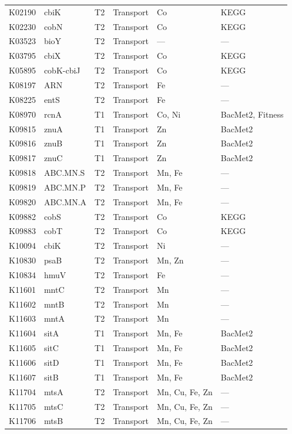 \documentclass[11pt]{article}
\begin{document}
\begin{longtable}{@{}llllp{3.8cm}l@{}}
K02190 & cbiK & T2 & Transport & Co & KEGG \\
K02230 & cobN & T2 & Transport & Co & KEGG \\
K03523 & bioY & T2 & Transport & --- & --- \\
K03795 & cbiX & T2 & Transport & Co & KEGG \\
K05895 & cobK-cbiJ & T2 & Transport & Co & KEGG \\
K08197 & ARN & T2 & Transport & Fe & --- \\
K08225 & entS & T2 & Transport & Fe & --- \\
K08970 & rcnA & T1 & Transport & Co, Ni & BacMet2, Fitness \\
K09815 & znuA & T1 & Transport & Zn & BacMet2 \\
K09816 & znuB & T1 & Transport & Zn & BacMet2 \\
K09817 & znuC & T1 & Transport & Zn & BacMet2 \\
K09818 & ABC.MN.S & T2 & Transport & Mn, Fe & --- \\
K09819 & ABC.MN.P & T2 & Transport & Mn, Fe & --- \\
K09820 & ABC.MN.A & T2 & Transport & Mn, Fe & --- \\
K09882 & cobS & T2 & Transport & Co & KEGG \\
K09883 & cobT & T2 & Transport & Co & KEGG \\
K10094 & cbiK & T2 & Transport & Ni & --- \\
K10830 & psaB & T2 & Transport & Mn, Zn & --- \\
K10834 & hmuV & T2 & Transport & Fe & --- \\
K11601 & mntC & T2 & Transport & Mn & --- \\
K11602 & mntB & T2 & Transport & Mn & --- \\
K11603 & mntA & T2 & Transport & Mn & --- \\
K11604 & sitA & T1 & Transport & Mn, Fe & BacMet2 \\
K11605 & sitC & T1 & Transport & Mn, Fe & BacMet2 \\
K11606 & sitD & T1 & Transport & Mn, Fe & BacMet2 \\
K11607 & sitB & T1 & Transport & Mn, Fe & BacMet2 \\
K11704 & mtsA & T2 & Transport & Mn, Cu, Fe, Zn & --- \\
K11705 & mtsC & T2 & Transport & Mn, Cu, Fe, Zn & --- \\
K11706 & mtsB & T2 & Transport & Mn, Cu, Fe, Zn & --- \\

\end{longtable}
\end{document}
